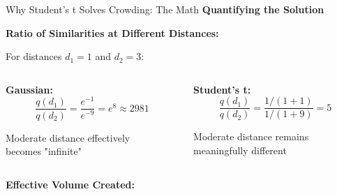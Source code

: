 \documentclass[10pt]{beamer}
\newcommand{\emphtext}[1]{\textcolor{upcblue}{\textbf{#1}}}
\begin{document}
\begin{frame}{Why Student's t Solves Crowding: The Math}
\emphtext{Quantifying the Solution}

\vspace{0.3cm}
\textbf{Ratio of Similarities at Different Distances:}

For distances $d_1 = 1$ and $d_2 = 3$:

\begin{columns}[T]
\begin{column}{0.48\textwidth}
\textbf{Gaussian:}
$$\frac{q(d_1)}{q(d_2)} = \frac{e^{-1}}{e^{-9}} = e^8 \approx 2981$$

\footnotesize
Moderate distance effectively\\
becomes "infinite"
\end{column}

\begin{column}{0.48\textwidth}
\textbf{Student's t:}
$$\frac{q(d_1)}{q(d_2)} = \frac{1/(1+1)}{1/(1+9)} = 5$$

\footnotesize
Moderate distance remains\\
meaningfully different
\end{column}
\end{columns}

\vspace{0.3cm}
\emphtext{Effective Volume Created:}

\begin{center}
\end{center}
\end{frame}
\end{document}
